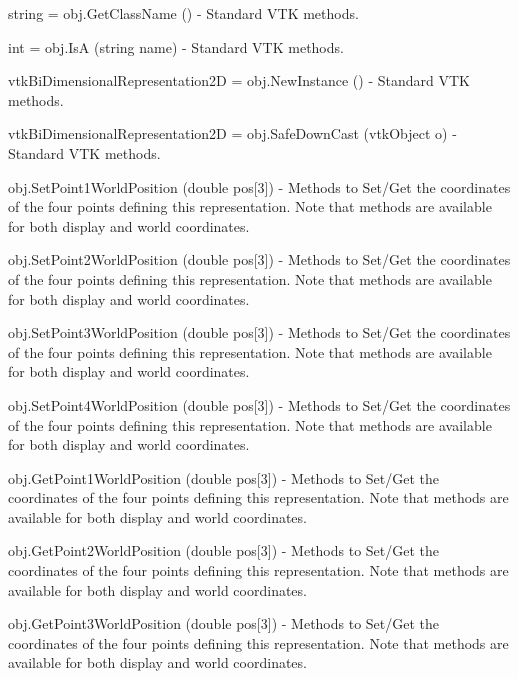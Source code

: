 \begin{DoxyItemize}
\item {\ttfamily string = obj.\-Get\-Class\-Name ()} -\/ Standard V\-T\-K methods.  
\item {\ttfamily int = obj.\-Is\-A (string name)} -\/ Standard V\-T\-K methods.  
\item {\ttfamily vtk\-Bi\-Dimensional\-Representation2\-D = obj.\-New\-Instance ()} -\/ Standard V\-T\-K methods.  
\item {\ttfamily vtk\-Bi\-Dimensional\-Representation2\-D = obj.\-Safe\-Down\-Cast (vtk\-Object o)} -\/ Standard V\-T\-K methods.  
\item {\ttfamily obj.\-Set\-Point1\-World\-Position (double pos\mbox{[}3\mbox{]})} -\/ Methods to Set/\-Get the coordinates of the four points defining this representation. Note that methods are available for both display and world coordinates.  
\item {\ttfamily obj.\-Set\-Point2\-World\-Position (double pos\mbox{[}3\mbox{]})} -\/ Methods to Set/\-Get the coordinates of the four points defining this representation. Note that methods are available for both display and world coordinates.  
\item {\ttfamily obj.\-Set\-Point3\-World\-Position (double pos\mbox{[}3\mbox{]})} -\/ Methods to Set/\-Get the coordinates of the four points defining this representation. Note that methods are available for both display and world coordinates.  
\item {\ttfamily obj.\-Set\-Point4\-World\-Position (double pos\mbox{[}3\mbox{]})} -\/ Methods to Set/\-Get the coordinates of the four points defining this representation. Note that methods are available for both display and world coordinates.  
\item {\ttfamily obj.\-Get\-Point1\-World\-Position (double pos\mbox{[}3\mbox{]})} -\/ Methods to Set/\-Get the coordinates of the four points defining this representation. Note that methods are available for both display and world coordinates.  
\item {\ttfamily obj.\-Get\-Point2\-World\-Position (double pos\mbox{[}3\mbox{]})} -\/ Methods to Set/\-Get the coordinates of the four points defining this representation. Note that methods are available for both display and world coordinates.  
\item {\ttfamily obj.\-Get\-Point3\-World\-Position (double pos\mbox{[}3\mbox{]})} -\/ Methods to Set/\-Get the coordinates of the four points defining this representation. Note that methods are available for both display and world coordinates.  

\end{DoxyItemize}

